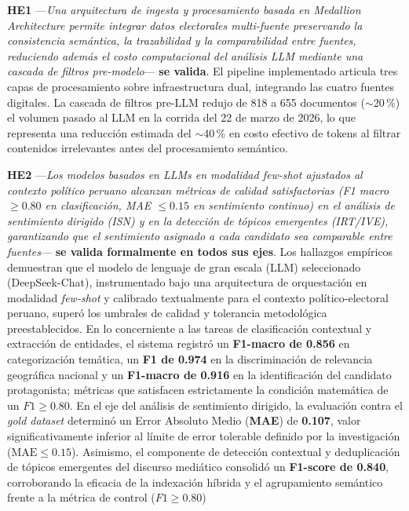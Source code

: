 \textbf{HE1} —\textit{Una arquitectura de ingesta y procesamiento basada en Medallion Architecture permite integrar datos electorales multi-fuente preservando la consistencia semántica, la trazabilidad y la comparabilidad entre fuentes, reduciendo además el costo computacional del análisis LLM mediante una cascada de filtros pre-modelo}— \textbf{se valida}. El pipeline implementado articula tres capas de procesamiento sobre infraestructura dual, integrando las cuatro fuentes digitales. La cascada de filtros pre-LLM redujo de 818 a 655 documentos ($\sim$20\,\%) el volumen pasado al LLM en la corrida del 22 de marzo de 2026, lo que representa una reducción estimada del $\sim$40\,\% en costo efectivo de tokens al filtrar contenidos irrelevantes antes del procesamiento semántico.

\textbf{HE2} —\textit{Los modelos basados en LLMs en modalidad few-shot ajustados al contexto político peruano alcanzan métricas de calidad satisfactorias (F1 macro $\geq 0.80$ en clasificación, MAE $\leq 0.15$ en sentimiento continuo) en el análisis de sentimiento dirigido (ISN) y en la detección de tópicos emergentes (IRT/IVE), garantizando que el sentimiento asignado a cada candidato sea comparable entre fuentes}— \textbf{se valida formalmente en todos sus ejes}. Los hallazgos empíricos demuestran que el modelo de lenguaje de gran escala (LLM) seleccionado (DeepSeek-Chat), instrumentado bajo una arquitectura de orquestación en modalidad \textit{few-shot} y calibrado textualmente para el contexto político-electoral peruano, superó los umbrales de calidad y tolerancia metodológica preestablecidos. En lo concerniente a las tareas de clasificación contextual y extracción de entidades, el sistema registró un \textbf{F1-macro de 0.856} en categorización temática, un \textbf{F1 de 0.974} en la discriminación de relevancia geográfica nacional y un \textbf{F1-macro de 0.916} en la identificación del candidato protagonista; métricas que satisfacen estrictamente la condición matemática de un $F1 \geq 0.80$. En el eje del análisis de sentimiento dirigido, la evaluación contra el \textit{gold dataset} determinó un Error Absoluto Medio (\textbf{MAE}) de \textbf{0.107}, valor significativamente inferior al límite de error tolerable definido por la investigación ($\text{MAE} \leq 0.15$). Asimismo, el componente de detección contextual y deduplicación de tópicos emergentes del discurso mediático consolidó un \textbf{F1-score de 0.840}, corroborando la eficacia de la indexación híbrida y el agrupamiento semántico frente a la métrica de control ($F1 \geq 0.80$)

